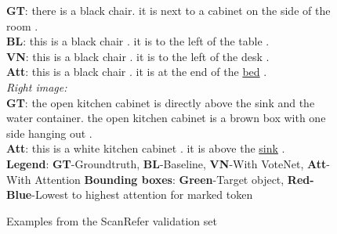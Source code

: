 \documentclass[10pt,twocolumn,letterpaper]{article}
\begin{document}
\begin{figure}[b]
\begin{flushleft}
{			\textbf{GT}: there is a black chair. it is next to a cabinet on the side of the room .\\
			\textbf{BL}: this is a black chair . it is to the left of the table .\\
			\textbf{VN}: this is a black chair . it is to the left of the desk .\\
			\textbf{Att}: this is a black chair . it is at the end of the \underline{bed} .\\
			\textit{Right image:}\\
			\textbf{GT}: the open kitchen cabinet is directly above the sink and the water container. the open kitchen cabinet is a brown box with one side hanging out .\\
			\textbf{Att}: this is a white kitchen cabinet . it is above the \underline{sink} .\\
			\textbf{Legend}: \textbf{GT}-Groundtruth, \textbf{BL}-Baseline, \textbf{VN}-With VoteNet, \textbf{Att}-With Attention \textbf{Bounding boxes}: \textbf{\color{green} Green}-Target object, \textbf{{\color{red}Red}-{\color{blue}Blue}}-Lowest to highest attention for marked token
		}
	\end{flushleft}
	\vspace{-1.\baselineskip}
	\caption{Examples from the ScanRefer validation set}
	\label{fig:examples}
\end{figure}

{\small


}
\end{document}
